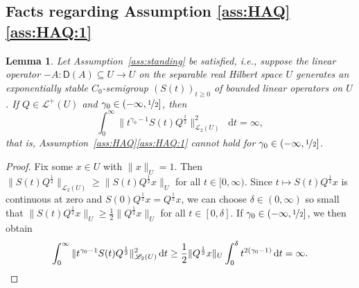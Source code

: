 \documentclass[reqno]{amsart}
\numberwithin{equation}{section}
\newcommand{\rd}{\mathop{}\!\mathrm{d}}
\newcommand{\from}{\colon}
\newcommand{\LO}{\mathscr L}
\newtheorem{lemma}{Lemma}[section]
\theoremstyle{remark}
\theoremstyle{definition}
\begin{document}
\subsection{Facts regarding Assumption \ref{ass:HAQ}\ref{ass:HAQ:1}}
\label{app:aux:facts-about-assumption}
\begin{lemma}\label{lem:intb-assumption-gammaleqhalf}
	Let Assumption~\textup{\ref{ass:standing}} be satisfied, i.e., 
	suppose the linear operator
	$-A \from \mathsf D(A) \subseteq U \to U$
	on the separable real Hilbert space $U$ generates an
	exponentially stable $C_0$-semigroup $(S(t))_{t\ge0}$ of bounded
	linear operators on $U$.
	If $Q \in \LO^+(U)$ and $\gamma_0 \in (-\infty, \nicefrac{1}{2}]$, then
	\[
	\int_0^\infty \| t^{\gamma_0-1} S(t) Q^\frac{1}{2} \|_{\mathscr L_2(U)}^2 \rd t = \infty,
	\]
	that is, Assumption~\textup{\ref{ass:HAQ}}\ref{ass:HAQ:1} cannot hold for $\gamma_0 \in (-\infty, \nicefrac{1}{2}]$.
\end{lemma}
%
\begin{proof}
	Fix some $x \in U$ with $\| x \|_U = 1$. Then
	$\| S(t) Q^\frac{1}{2} \|_{\mathscr L_2(U)} \ge \| S(t) Q^\frac{1}{2}x \|_{U}$ for all $t \in [0,\infty)$.
	Since $t \mapsto  S(t) Q^\frac{1}{2}x$ is continuous at zero
	and $S(0) Q^\frac{1}{2}x = Q^\frac{1}{2}x$, we can choose $\delta \in (0,\infty)$
	so small that $\| S(t) Q^\frac{1}{2}x \|_U \ge \frac{1}{2} \| Q^\frac{1}{2}x \|_U$ for all $t \in [0,\delta]$.
	If $\gamma_0 \in (-\infty, \nicefrac{1}{2}]$, we then obtain
	\[
	\int_0^\infty \| t^{\gamma_0-1} S(t) Q^\frac{1}{2} \|_{\mathscr L_2(U)}^2 \rd t 
	\ge 
	\frac{1}{2} \| Q^\frac{1}{2}x \|_U \int_0^\delta t^{2(\gamma_0-1)}\rd t
	=
	\infty.
	\qedhere
	\]
\end{proof}
\end{document}
